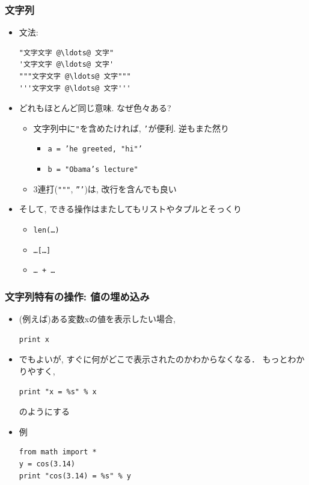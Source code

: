 \documentclass[10pt,dvipdfmx]{beamer}
\begin{document}
\begin{frame}[fragile]
\frametitle{文字列}
\begin{itemize}
\item 文法:
\begin{lstlisting}
"文字文字 @\ldots@ 文字"
'文字文字 @\ldots@ 文字'
"""文字文字 @\ldots@ 文字"""
'''文字文字 @\ldots@ 文字'''
\end{lstlisting}

\item どれもほとんど同じ意味. なぜ色々ある?
  \begin{itemize}
  \item 文字列中に{\tt "}を含めたければ, {\tt '}が便利. 逆もまた然り
    \begin{itemize}
    \item {\tt a = 'he greeted, "hi"'}
    \item {\tt b = "Obama's lecture"}
    \end{itemize}
  \item 3連打({\tt """}, {\tt '''})は, 改行を含んでも良い
  \end{itemize}

\item そして, できる操作はまたしてもリストやタプルとそっくり
  \begin{itemize}
  \item {\tt len(\ldots)}
  \item {\tt \ldots[\ldots]}
  \item {\tt \ldots\ + \ldots}
  \end{itemize}
\end{itemize}
\end{frame}

\begin{frame}[fragile]
\frametitle{文字列特有の操作: 値の埋め込み}
\begin{itemize}
\item (例えば)ある変数xの値を表示したい場合,
\begin{lstlisting}
print x    
\end{lstlisting}
\item でもよいが, すぐに何がどこで表示されたのかわからなくなる．
もっとわかりやすく,
\begin{lstlisting}
print "x = %s" % x
\end{lstlisting}
のようにする

\item 例
\begin{lstlisting}
from math import *
y = cos(3.14)
print "cos(3.14) = %s" % y
\end{lstlisting}
\end{itemize}
\end{frame}
\end{document}
